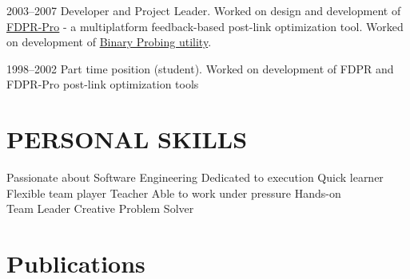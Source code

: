 \documentclass[]{deedy-resume}
\begin{document}
\begin{minipage}[t]{0.66\textwidth}
\vspace{\topsep} %
\begin{tightemize}
\item 2003--2007 Developer and Project Leader. Worked on design and development of \href{http://www.haifa.il.ibm.com/projects/systems/cot/fdpr/}{FDPR-Pro} - a multiplatform feedback-based post-link optimization tool. Worked on development of \href{https://www.research.ibm.com/haifa/projects/systems/cot/bprober/index.html}{Binary Probing utility}.
\item  1998--2002 Part time position (student). Worked on development of FDPR and FDPR-Pro post-link optimization tools
\end{tightemize}
\sectionsep

\section{PERSONAL SKILLS}
Passionate about Software Engineering \textbullet{} Dedicated to execution \textbullet{}  Quick learner\\
Flexible team player \textbullet{} Teacher \textbullet{}  Able to work under pressure \textbullet{} Hands-on \\
Team Leader \textbullet{} Creative Problem Solver 
\sectionsep

\section{Publications}
\renewcommand{\section}[2]{}%


\nocite{*}



%
%


\end{minipage}
\end{document}
